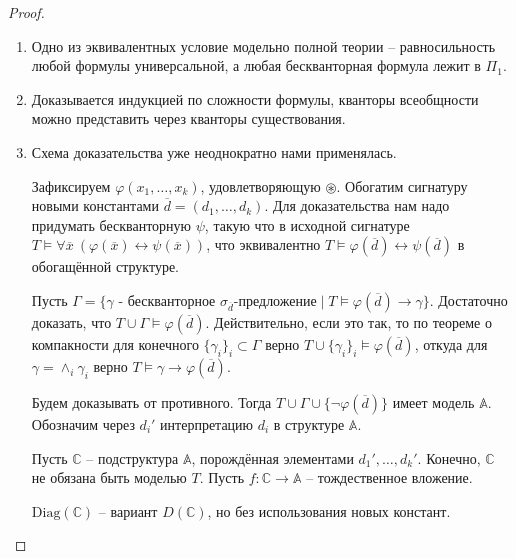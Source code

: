 \begin{proof}\
    \begin{enumerate}
        \item Одно из эквивалентных условие модельно полной теории -- равносильность любой формулы универсальной, а любая бескванторная формула лежит в $\Pi_1$.

        \item %
        Доказывается индукцией по сложности формулы, кванторы всеобщности можно представить через кванторы существования.

   \item
       Схема доказательства уже неоднократно нами применялась.

       Зафиксируем $\varphi(x_1, \ldots, x_k)$, удовлетворяющую $\circledast$. Обогатим сигнатуру новыми константами $\overline{d} = (d_1, \ldots, d_k)$. Для доказательства нам надо придумать бескванторную $\psi$, такую что в исходной сигнатуре $T\models \forall \overline{x}~(\varphi(\overline{x})\leftrightarrow\psi(\overline{x}))$, что эквивалентно $T\models \varphi(\overline{d}) \leftrightarrow \psi(\overline{d})$ в обогащённой структуре.

       Пусть $\Gamma = \{\gamma \text{ - бескванторное }\sigma_{\overline{d}} \text{-предложение}  \mid T\models \varphi(\overline{d})\rightarrow \gamma\}$. Достаточно доказать, что $T\cup\Gamma\models\varphi(\overline{d})$. Действительно, если это так, то по теореме о компакности для конечного $\{\gamma_i\}_i\subset\Gamma$ верно $T\cup\{\gamma_i\}_i\models \varphi(\overline{d})$, откуда для $\gamma=\wedge_i\gamma_i$ верно $T\models \gamma\rightarrow \varphi(\overline{d})$.

       Будем доказывать от противного. Тогда $T\cup\Gamma\cup\{\neg\varphi(\overline{d})\}$ имеет модель $\mathbb{A}$. Обозначим через $d_i'$ интерпретацию $d_i$ в структуре $\mathbb{A}$.

       Пусть $\mathbb{C}$ -- подструктура $\mathbb{A}$, порождённая элементами $d_1',\ldots, d_k'$. Конечно, $\mathbb{C}$ не обязана быть моделью $T$. Пусть $f:\mathbb{C}\rightarrow\mathbb{A}$ -- тождественное вложение.
        
       $\text{Diag}(\mathbb{C})$ -- вариант $D(\mathbb{C})$, но без использования новых констант.


\end{enumerate}
\end{proof}
